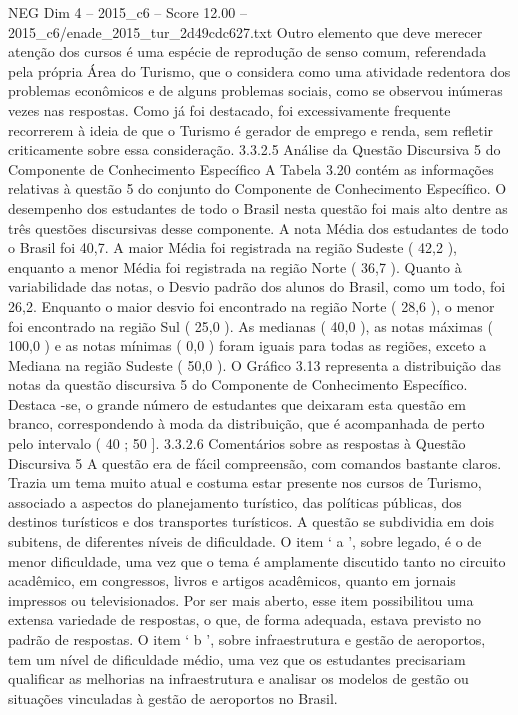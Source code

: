 \begin{textsample}{NEG Dim 4 – 2015\_c6 – Score 12.00 – 2015\_c6/enade\_2015\_tur\_2d49cdc627.txt}
Outro elemento que deve merecer atenção dos cursos é uma espécie de reprodução de senso comum, referendada pela própria Área do Turismo, que o considera como uma atividade redentora dos problemas econômicos e de alguns problemas sociais, como se observou inúmeras vezes nas respostas.
Como já foi destacado, foi excessivamente frequente recorrerem à ideia de que o Turismo é gerador de emprego e renda, sem refletir criticamente sobre essa consideração. 3.3.2.5 Análise da Questão Discursiva 5 do Componente de Conhecimento Específico A Tabela 3.20 contém as informações relativas à questão 5 do conjunto do Componente de Conhecimento Específico.
O desempenho dos estudantes de todo o Brasil nesta questão foi mais alto dentre as três questões discursivas desse componente.
A nota Média dos estudantes de todo o Brasil foi 40,7.
A maior Média foi registrada na região Sudeste ( 42,2 ), enquanto a menor Média foi registrada na região Norte ( 36,7 ).
Quanto à variabilidade das notas, o Desvio padrão dos alunos do Brasil, como um todo, foi 26,2.
Enquanto o maior desvio foi encontrado na região Norte ( 28,6 ), o menor foi encontrado na região Sul ( 25,0 ).
As medianas ( 40,0 ), as notas máximas ( 100,0 ) e as notas mínimas ( 0,0 ) foram iguais para todas as regiões, exceto a Mediana na região Sudeste ( 50,0 ).
O Gráfico 3.13 representa a distribuição das notas da questão discursiva 5 do Componente de Conhecimento Específico.
Destaca -se, o grande número de estudantes que deixaram esta questão em branco, correspondendo à moda da distribuição, que é acompanhada de perto pelo intervalo ( 40 ; 50 ]. 3.3.2.6 Comentários sobre as respostas à Questão Discursiva 5 A questão era de fácil compreensão, com comandos bastante claros.
Trazia um tema muito atual e costuma estar presente nos cursos de Turismo, associado a aspectos do planejamento turístico, das políticas públicas, dos destinos turísticos e dos transportes turísticos.
A questão se subdividia em dois subitens, de diferentes níveis de dificuldade.
O item ‘ a ’, sobre legado, é o de menor dificuldade, uma vez que o tema é amplamente discutido tanto no circuito acadêmico, em congressos, livros e artigos acadêmicos, quanto em jornais impressos ou televisionados.
Por ser mais aberto, esse item possibilitou uma extensa variedade de respostas, o que, de forma adequada, estava previsto no padrão de respostas.
O item ‘ b ’, sobre infraestrutura e gestão de aeroportos, tem um nível de dificuldade médio, uma vez que os estudantes precisariam qualificar as melhorias na infraestrutura e analisar os modelos de gestão ou situações vinculadas à gestão de aeroportos no Brasil.

\end{textsample}
